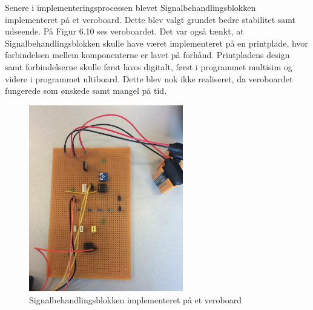 Senere i implementeringsprocessen blevet Signalbehandlingsblokken implementeret på et veroboard. Dette blev valgt grundet bedre stabilitet samt udseende. På Figur 6.10 ses veroboardet. Det var også tænkt, at Signalbehandlingsblokken skulle have været implementeret på en printplade, hvor forbindelsen mellem komponenterne er lavet på forhånd. Printpladens design samt forbindelserne skulle først laves digitalt, først i programmet multisim og videre i programmet ultiboard. Dette blev nok ikke realiseret, da veroboardet fungerede som ønskede samt mangel på tid. 

\begin{figure}[H]
	\centering
	\includegraphics[width=0.6\textwidth]{Figurer/Snip20151207_46}
	\caption{Signalbehandlingsblokken implementeret på et veroboard}
\end{figure}

